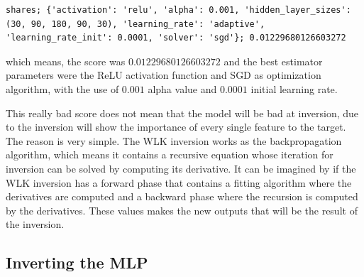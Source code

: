 \begin{lstlisting}
shares; {'activation': 'relu', 'alpha': 0.001, 'hidden_layer_sizes': (30, 90, 180, 90, 30), 'learning_rate': 'adaptive', 'learning_rate_init': 0.0001, 'solver': 'sgd'}; 0.01229680126603272
\end{lstlisting}
which means, the score was $0.01229680126603272$ and the best estimator parameters were the ReLU activation function and SGD as optimization algorithm, with the use of $0.001$ alpha value and $0.0001$ initial learning rate. \medskip

This really bad score does not mean that the model will be bad at inversion, due to the inversion will show the importance of every single feature to the target. The reason is very simple. The WLK inversion works as the backpropagation algorithm, which means it contains a recursive equation whose iteration for inversion can be solved by computing its derivative. It can be imagined by if the WLK inversion has a forward phase that contains a fitting algorithm where the derivatives are computed and a backward phase where the recursion is computed by the derivatives. These values makes the new outputs that will be the result of the inversion.


\subsection{Inverting the MLP}


